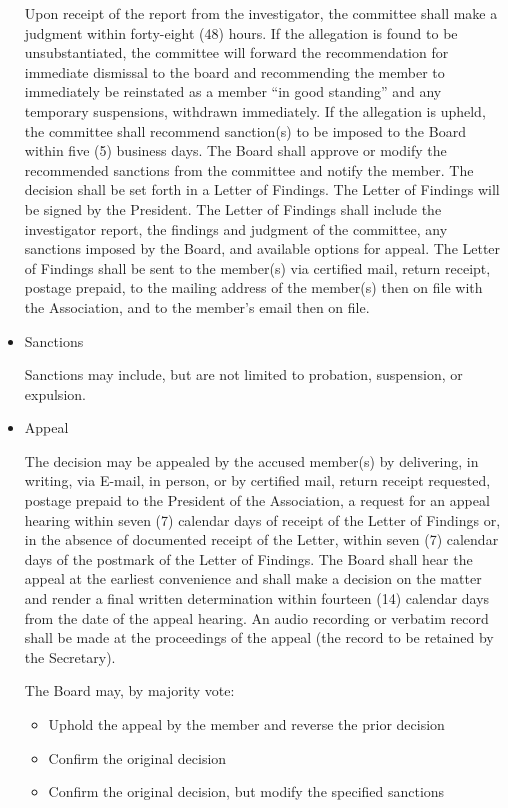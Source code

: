 \documentclass[letterpaper,11pt,colorlinks=true,allcolors=blue]{article}
\begin{document}
\begin{itemize}
Upon receipt of the report from the investigator, the committee shall make a judgment within forty-eight (48) hours.  If the allegation is found to be unsubstantiated, the committee will forward the recommendation for immediate dismissal to the board and recommending the member to immediately be reinstated as a member “in good standing” and any temporary suspensions, withdrawn immediately.  If the allegation is upheld, the committee shall recommend sanction(s) to be imposed to the Board within five (5) business days. The Board shall approve or modify the recommended sanctions from the committee and notify the member. The decision shall be set forth in a Letter of Findings. The Letter of Findings will be signed by the President. The Letter of Findings shall include the investigator report, the findings and judgment of the committee, any sanctions imposed by the Board, and available options for appeal.  The Letter of Findings shall be sent to the member(s) via certified mail, return receipt, postage prepaid, to the mailing address of the member(s) then on file with the Association, and to the member’s email then on file.

\item Sanctions

Sanctions may include, but are not limited to probation, suspension, or expulsion.

\item Appeal

The decision may be appealed by the accused member(s) by delivering, in writing, via E-mail, in person, or by certified mail, return receipt requested, postage prepaid to the President of the Association, a request for an appeal hearing within seven (7) calendar days of receipt of the Letter of Findings or, in the absence of documented receipt of the Letter, within seven (7) calendar days of the postmark of the Letter of Findings. The Board shall hear the appeal at the earliest convenience and shall make a decision on the matter and render a final written determination within fourteen (14) calendar days from the date of the appeal hearing.  An audio recording or verbatim record shall be made at the proceedings of the appeal (the record to be retained by the Secretary).

The Board may, by majority vote:
\begin{itemize}
\item Uphold the appeal by the member and reverse the prior decision
\item Confirm the original decision
\item Confirm the original decision, but modify the specified sanctions
\end{itemize}


\end{itemize}
\end{document}
